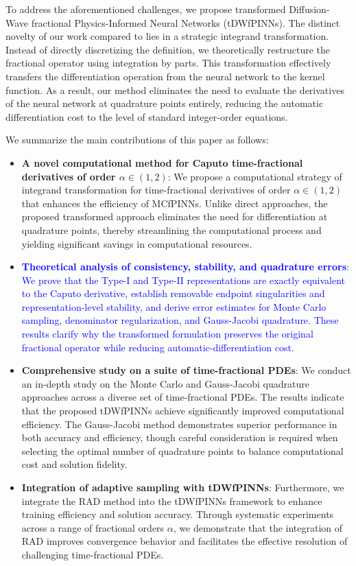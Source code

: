 \documentclass[preprint,3p,times]{elsarticle}
\newcommand{\revise}[1]{\textcolor{blue}{#1}}
\begin{document}
To address the aforementioned challenges, we propose transformed Diffusion-Wave fractional Physics-Informed Neural Networks (tDWfPINNs). The distinct novelty of our work compared to \cite{Hu2024:CMAME,Lin2025} lies in a strategic integrand transformation. Instead of directly discretizing the definition, we theoretically restructure the fractional operator using integration by parts. This transformation effectively transfers the differentiation operation from the neural network to the kernel function. As a result, our method eliminates the need to evaluate the derivatives of the neural network at quadrature points entirely, reducing the automatic differentiation cost to the level of standard integer-order equations.

We summarize the main contributions of this paper as follows:
\begin{itemize}
    \item \textbf{A novel computational method for Caputo time-fractional derivatives of order $\alpha \in (1, 2)$}: We propose a computational strategy of integrand transformation for time-fractional derivatives of order $\alpha \in (1, 2)$ that enhances the efficiency of MCfPINNs. Unlike direct approaches, the proposed transformed approach eliminates the need for differentiation at quadrature points, thereby streamlining the computational process and yielding significant savings in computational resources.
    \item \revise{\textbf{Theoretical analysis of consistency, stability, and quadrature errors}: We prove that the Type-I and Type-II representations are exactly equivalent to the Caputo derivative, establish removable endpoint singularities and representation-level stability, and derive error estimates for Monte Carlo sampling, denominator regularization, and Gauss-Jacobi quadrature. These results clarify why the transformed formulation preserves the original fractional operator while reducing automatic-differentiation cost.}
    \item \textbf{Comprehensive study on a suite of time-fractional PDEs}: We conduct an in-depth study on the Monte Carlo and Gauss-Jacobi quadrature approaches across a diverse set of time-fractional PDEs. The results indicate that the proposed tDWfPINNs achieve significantly improved computational efficiency. The Gauss-Jacobi method demonstrates superior performance in both accuracy and efficiency, though careful consideration is required when selecting the optimal number of quadrature points to balance computational cost and solution fidelity.
    \item \textbf{Integration of adaptive sampling with tDWfPINNs}: Furthermore, we integrate the RAD method \cite{LuLu:2023:RAD} into the tDWfPINNs  framework to enhance training efficiency and solution accuracy. Through systematic experiments across a range of fractional orders $\alpha$, we demonstrate that the integration of RAD improves convergence behavior and facilitates the effective resolution of challenging time-fractional PDEs.
\end{itemize}
\end{document}
